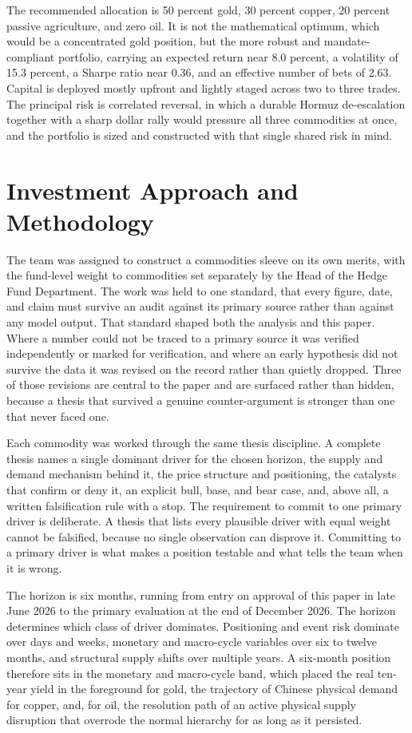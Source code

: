 \documentclass[11pt,a4paper]{article}
\begin{document}
The recommended allocation is 50 percent gold, 30 percent copper, 20 percent passive agriculture, and zero oil. It is not the mathematical optimum, which would be a concentrated gold position, but the more robust and mandate-compliant portfolio, carrying an expected return near 8.0 percent, a volatility of 15.3 percent, a Sharpe ratio near 0.36, and an effective number of bets of 2.63. Capital is deployed mostly upfront and lightly staged across two to three trades. The principal risk is correlated reversal, in which a durable Hormuz de-escalation together with a sharp dollar rally would pressure all three commodities at once, and the portfolio is sized and constructed with that single shared risk in mind.

\section{Investment Approach and Methodology}

The team was assigned to construct a commodities sleeve on its own merits, with the fund-level weight to commodities set separately by the Head of the Hedge Fund Department. The work was held to one standard, that every figure, date, and claim must survive an audit against its primary source rather than against any model output. That standard shaped both the analysis and this paper. Where a number could not be traced to a primary source it was verified independently or marked for verification, and where an early hypothesis did not survive the data it was revised on the record rather than quietly dropped. Three of those revisions are central to the paper and are surfaced rather than hidden, because a thesis that survived a genuine counter-argument is stronger than one that never faced one.

Each commodity was worked through the same thesis discipline. A complete thesis names a single dominant driver for the chosen horizon, the supply and demand mechanism behind it, the price structure and positioning, the catalysts that confirm or deny it, an explicit bull, base, and bear case, and, above all, a written falsification rule with a stop. The requirement to commit to one primary driver is deliberate. A thesis that lists every plausible driver with equal weight cannot be falsified, because no single observation can disprove it. Committing to a primary driver is what makes a position testable and what tells the team when it is wrong.

The horizon is six months, running from entry on approval of this paper in late June 2026 to the primary evaluation at the end of December 2026. The horizon determines which class of driver dominates. Positioning and event risk dominate over days and weeks, monetary and macro-cycle variables over six to twelve months, and structural supply shifts over multiple years. A six-month position therefore sits in the monetary and macro-cycle band, which placed the real ten-year yield in the foreground for gold, the trajectory of Chinese physical demand for copper, and, for oil, the resolution path of an active physical supply disruption that overrode the normal hierarchy for as long as it persisted.
\end{document}
